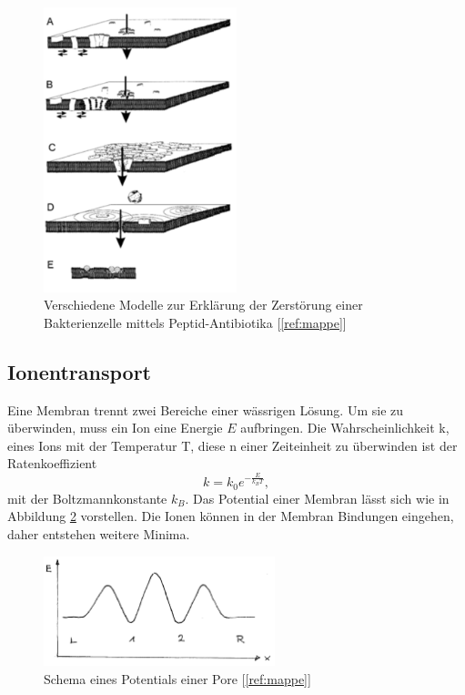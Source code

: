 \documentclass[a4paper,ngerman]{scrartcl}
\begin{document}
\begin{figure}
\includegraphics[width=0.5\textwidth]{abbildungen/wirkmechanismus.png}
\caption{Verschiedene Modelle zur Erklärung der Zerstörung einer Bakterienzelle mittels Peptid-Antibiotika [\ref{ref:mappe}]}
\label{fig:wirkmechanismus}
\end{figure}


\subsection{Ionentransport}

Eine Membran trennt zwei Bereiche einer wässrigen Lösung. Um sie zu überwinden, muss ein Ion eine Energie $E$ aufbringen. Die  Wahrscheinlichkeit k, eines Ions mit der Temperatur T, diese n einer Zeiteinheit zu überwinden ist der Ratenkoeffizient
\begin{equation} \label{eqn:rate}
k = k_0 e^{-\frac{E}{k_B T}},
\end{equation}
mit der Boltzmannkonstante $k_{B}$. Das Potential einer Membran lässt sich wie in Abbildung \ref{fig:potential-einfach} vorstellen. Die Ionen können in der Membran Bindungen eingehen, daher entstehen weitere Minima.

\begin{figure}
\includegraphics[width=0.6\textwidth]{abbildungen/potential-einfach.png}
\caption{Schema eines Potentials einer Pore [\ref{ref:mappe}]}
\label{fig:potential-einfach}
\end{figure}
\end{document}
